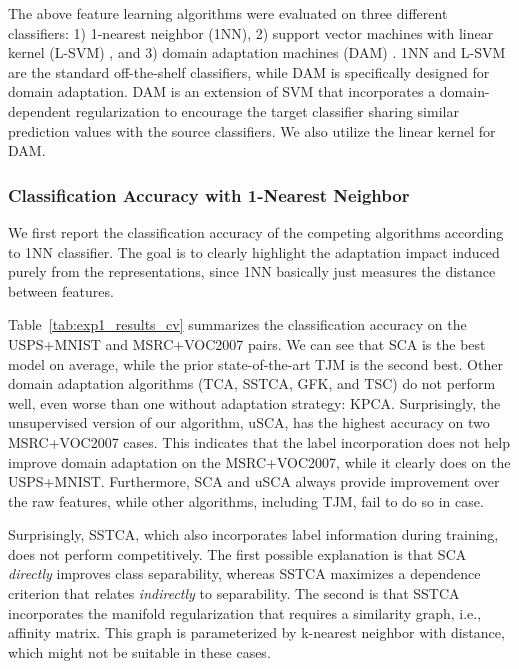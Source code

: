 \documentclass[10pt,journal,compsoc]{IEEEtran}
\begin{document}
The above feature learning algorithms were evaluated on three different classifiers: 
1) 1-nearest neighbor (1NN), 2) support vector machines with linear kernel (L-SVM) \cite{Boser:1992aa}, and 3) domain adaptation machines (DAM) \cite{DAM:2012}.
1NN and L-SVM are the standard off-the-shelf classifiers, while DAM is specifically designed for domain adaptation. 
DAM is an extension of SVM that incorporates a domain-dependent regularization to encourage the target classifier sharing similar prediction values with the source classifiers.
We also utilize the linear kernel for DAM.


\subsubsection{Classification Accuracy with 1-Nearest Neighbor}
\label{sec:exp1_acc}
We first report the classification accuracy of the competing algorithms according to 1NN classifier.
The goal is to clearly highlight the adaptation impact induced purely from the representations,
since 1NN basically just measures the distance between features.


Table~\ref{tab:exp1_results_cv} summarizes the classification accuracy on the USPS+MNIST and MSRC+VOC2007 pairs.
We can see that SCA is the best model on average, while the prior state-of-the-art TJM is the second best.
Other domain adaptation algorithms (TCA, SSTCA, GFK, and TSC) do not perform well, even worse than one without adaptation strategy: KPCA.
Surprisingly, the unsupervised version of our algorithm, uSCA, has the highest accuracy on two MSRC+VOC2007 cases.
This indicates that the label incorporation does not help improve domain adaptation on the MSRC+VOC2007, while it clearly does on the USPS+MNIST.
Furthermore, SCA and uSCA always provide improvement over the raw features, while other algorithms, including TJM, fail to do so in  case.

Surprisingly, SSTCA, which also incorporates label information during training, does not perform competitively. 
The first possible explanation is that SCA \emph{directly} improves class separability, whereas SSTCA maximizes a dependence criterion that relates \emph{indirectly} to separability.
The second is that SSTCA incorporates the manifold regularization that requires a similarity graph, i.e., affinity matrix. 
This graph is parameterized by k-nearest neighbor with  distance, which might not be suitable in these cases.
\end{document}
